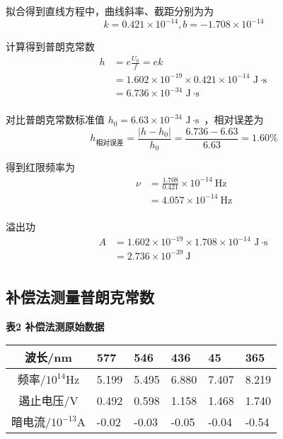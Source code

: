\documentclass[10pt,a4paper]{article}	%
\makeatletter
\newenvironment{tablehere}
{\def\@captype{table}}
{}
\makeatother
\begin{document}
	拟合得到直线方程中，曲线斜率、截距分别为为
	$$
	k=0.421\times 10^{-14}, b = -1.708 \times 10^{-14}
	$$
	
	计算得到普朗克常数
	$$
	\begin{aligned}
		h&=e \frac{U_0}{f} = ek \\
		&=1.602 \times 10 ^ {-19} \times 0.421 \times 10^{-14} \, \text{J$\, \cdot $s}\\
		&=6.736\times 10^{-34}\, \text{J$\, \cdot $s} \\
	\end{aligned}
	$$

	对比普朗克常数标准值 $h_0 = 6.63\times 10^{-34}\, \text{J$\, \cdot $s}$ ，相对误差为
	\[
		h_{\text{相对误差}}=\dfrac{|h-h_0|}{h_0}=\dfrac{6.736-6.63}{6.63}=1.60\% 
	\]

	得到红限频率为
	\[
		\begin{aligned}
			\nu &= \frac{1.708}{0.421} \times 10^{-14} \mathrm{~Hz}\\
			&= 4.057 \times 10^{-14}  \mathrm{~Hz}\\
		\end{aligned}
	\]

	溢出功
	\[
		\begin{aligned}
			A &= 1.602 \times 10 ^ {-19} \times 1.708 \times 10^{-14} \, \text{J$\, \cdot $s}\\
			&=2.736\times 10^{-39}\mathrm{~J} \\
		\end{aligned}
	\]
	
	\subsection{补偿法测量普朗克常数}

	\begin{tablehere}
		\caption*{\bf 表2 补偿法测原始数据}
		\noindent
		\begin{center}
			\begin{tabularx}{0.95\linewidth}{|c|Y|Y|Y|Y|Y|}
				\hline
				波长/nm    & 577   & 546   & 436   & 45    & 365 \\ \hline
				频率/$10^{14}$Hz & 5.199 & 5.495 & 6.880 & 7.407 & 8.219 \\ \hline
				遏止电压/V & 0.492 & 0.598 & 1.158 & 1.468 & 1.740 \\ \hline
				暗电流/$10^{-13}$A & -0.02 & -0.03 & -0.05 & -0.04 & -0.54 \\ \hline
				\end{tabularx}
		\end{center}
		\vspace*{1em}
	\end{tablehere}
\end{document}
